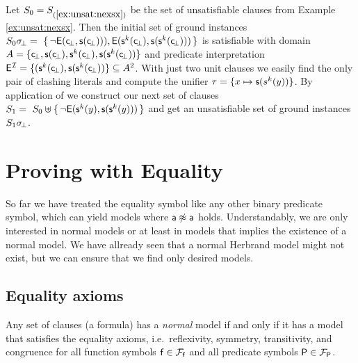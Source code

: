 \begin{example}\label{ex:unsat2}
Let $S_0 = S_{(\ref{ex:unsat:nexsx})}$ be the set of unsatisfiable clauses from Example \ref{ex:unsat:nexsx}. 
Then the initial set of ground instances 
$S_0\sigma\!_\bot =\
\{\,
{ \lnot{\mathsf E}({\mathsf c}\!_\bot, {\mathsf s}({\mathsf c}\!_\bot)))}, 
{ {\mathsf E}({\mathsf s}^k({\mathsf c}\!_\bot), {\mathsf s}({\mathsf s}^k({\mathsf c}\!_\bot)))}
\,\}$
is satisfiable with domain $A = \{ {\mathsf c}\!_\bot, {\mathsf s}({\mathsf c}\!_\bot), {\mathsf s}^k({\mathsf c}\!_\bot), {\mathsf s}({\mathsf s}^k({\mathsf c}\!_\bot)) \}$
and predicate interpretation 
${\mathsf E}^{\mathcal I} = \{ ({\mathsf s}^k({\mathsf c}\!_\bot), {\mathsf s}({\mathsf s}^k({\mathsf c}\!_\bot))
 \} \subseteq A^2$. 
% 
 With just two unit clauses we easily find the only pair of clashing literals and compute the unifier
 $\tau = \{ x\mapsto {\mathsf s}(s^k(y)) \}$. 
 By application of \InstGen we construct our next set of clauses
$
S_1 =\
S_0 \uplus
 \{\,
 { \lnot{\mathsf E}({\mathsf s}^k(y), {\mathsf s}({\mathsf s}^k(y)))}
 \,\}
 $ 
 and get an unsatisfiable set of ground instances $S_1\sigma\!_\bot$.
\end{example}




\section{Proving with Equality}

So far we have treated the equality symbol like any other binary predicate symbol, 
which can yield models where ${\mathsf a}\not\approx{\mathsf a}$ holds. 
Understandably, we are only interested in normal models or 
at least in models that implies the existence of a normal model.
We have allready seen that a normal Herbrand model might not exist,
but we can ensure that we find only desired models.

\subsection{Equality axioms}

\begin{theorem}\cite{Harrison:2009:HPL:1540610}
	Any set of clauses (a formula) has a \emph{normal} model 
	if and only if it has a model that satisfies the 
	{\myem equality axioms}, i.e.~reflexivity, symmetry, transitivity, 
	and congruence for all function symbols ${\mathsf f}\in{{\mathcal F}_{\mathsf f}}$
	and all predicate symbols ${\mathsf P}\in{{\mathcal F}_{\mathsf P}}$.
\end{theorem}


